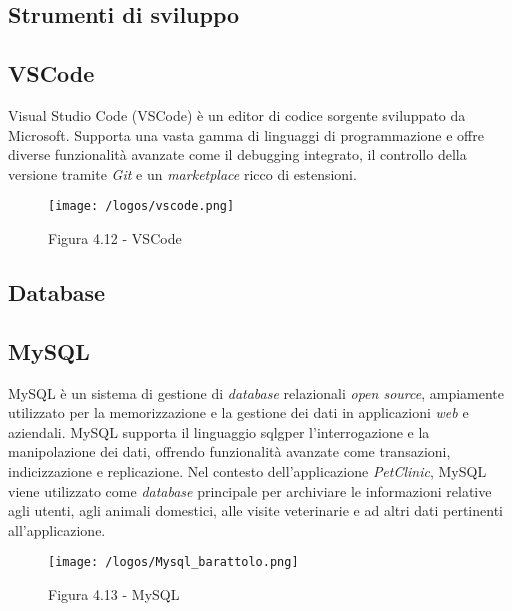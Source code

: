 \newpage
\subsection{Strumenti di sviluppo}
\subsection*{VSCode}
Visual Studio Code (VSCode) è un editor di codice sorgente sviluppato da Microsoft. Supporta una vasta gamma di linguaggi di programmazione e offre diverse funzionalità avanzate come il debugging integrato, il controllo della versione tramite \emph{Git} e un \emph{marketplace} ricco di estensioni.
\begin{figure}[H] 
    \centering 
    \texttt{[image: /logos/vscode.png]} 
    \caption{Figura 4.12 - VSCode}
\end{figure}


\newpage
\subsection{Database}
\subsection*{MySQL}
MySQL è un sistema di gestione di \emph{database} relazionali \emph{open source}, ampiamente utilizzato per la memorizzazione e la gestione dei dati in applicazioni \emph{web} e aziendali. MySQL supporta il linguaggio \gls{sqlg}\glsfirstoccur per l'interrogazione e la manipolazione dei dati, offrendo funzionalità avanzate come transazioni, indicizzazione e replicazione. Nel contesto dell'applicazione \emph{PetClinic}, MySQL viene utilizzato come \emph{database} principale per archiviare le informazioni relative agli utenti, agli animali domestici, alle visite veterinarie e ad altri dati pertinenti all'applicazione.
\begin{figure}[H] 
    \centering 
    \texttt{[image: /logos/Mysql\_barattolo.png]} 
    \caption{Figura 4.13 - MySQL}
\end{figure}


\newpage
